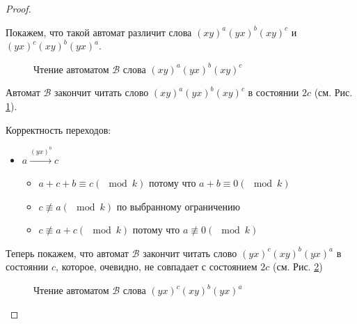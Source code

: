 \documentclass{article}
\begin{document}
\begin{proof}
\begin{enumerate}
			Покажем, что такой автомат различит слова $(xy)^a(yx)^b(xy)^c$ и\\ $(yx)^c(xy)^b(yx)^a$.
			
			\begin{figure}
				\caption{Чтение автоматом $\mathscr{B}$ слова $(xy)^a(yx)^b(xy)^c$}
				\label{process1_a+c_a}
			\end{figure}
			
			Автомат $\mathscr{B}$ закончит читать слово $(xy)^a(yx)^b(xy)^c$ в состоянии $2c$ (см. Рис. \ref{process1_a+c_a}).
			
			Корректность переходов:
			\begin{itemize}
				\item $a \xrightarrow{(yx)^b} c$
				\begin{itemize}
					\item $a+c+b \equiv c (\mod k)$ потому что $a+b \equiv 0 (\mod k)$
					\item $c \not \equiv a (\mod k)$ по выбранному ограничению
					\item $c \not \equiv a+c (\mod k)$ потому что $a \not \equiv 0 (\mod k)$
				\end{itemize}
			\end{itemize}
		
			Теперь покажем, что автомат $\mathscr{B}$ закончит читать слово $(yx)^c(xy)^b(yx)^a$ в состоянии $c$, которое, очевидно, не совпадает с состоянием $2c$ (см. Рис. \ref{process2_a+c_a})
			
			\begin{figure}
				\caption{Чтение автоматом $\mathscr{B}$ слова $(yx)^c(xy)^b(yx)^a$}
				\label{process2_a+c_a}
			\end{figure}
		

\end{enumerate}
\end{proof}
\end{document}
